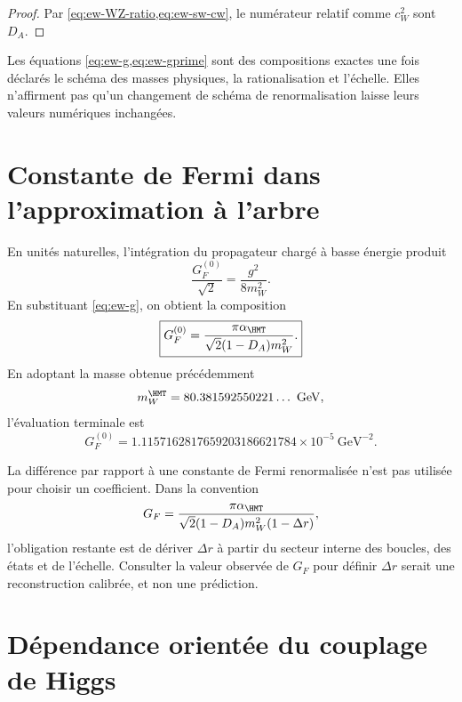 \begin{proof}
Par \cref{eq:ew-WZ-ratio,eq:ew-sw-cw}, le numérateur relatif comme
\(c_W^2\) sont \(D_A\).
\end{proof}

Les équations \cref{eq:ew-g,eq:ew-gprime} sont des compositions exactes une
fois déclarés le schéma des masses physiques, la rationalisation et l'échelle. Elles
n'affirment pas qu'un changement de schéma de renormalisation laisse leurs
valeurs numériques inchangées.

\section{Constante de Fermi dans l'approximation à l'arbre}

En unités naturelles, l'intégration du propagateur chargé à basse
énergie produit
\begin{equation}
\label{eq:ew-GF-def}
\frac{G_F^{(0)}}{\sqrt2}=\frac{g^2}{8m_W^2}.
\end{equation}
En substituant \cref{eq:ew-g}, on obtient la composition
\begin{equation}
\label{eq:ew-GF}
\boxed{
G_F^{(0)}
=\frac{\pi\alpha_{\HMT}}
{\sqrt2(1-D_A)m_W^2}.}
\end{equation}
En adoptant la masse obtenue précédemment
\begin{equation}
\label{eq:ew-W-output}
m_W^{\HMT}=80.381592550221\ldots\ \mathrm{GeV},
\end{equation}
l'évaluation terminale est
\begin{equation}
\label{eq:ew-GF-value}
\boxed{
G_F^{(0)}
=1.1157162817659203186621784\times10^{-5}\ \mathrm{GeV}^{-2}.}
\end{equation}

La différence par rapport à une constante de Fermi renormalisée n'est pas utilisée
pour choisir un coefficient. Dans la convention
\begin{equation}
\label{eq:ew-Delta-r}
G_F
=\frac{\pi\alpha_{\HMT}}
{\sqrt2(1-D_A)m_W^2(1-\Delta r)},
\end{equation}
l'obligation restante est de dériver \(\Delta r\) à partir du secteur interne des
boucles, des états et de l'échelle. Consulter la valeur observée de \(G_F\) pour définir
\(\Delta r\) serait une reconstruction calibrée, et non une prédiction.

\section{Dépendance orientée du couplage de Higgs}

